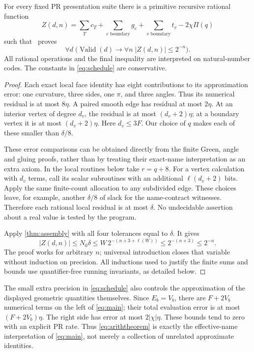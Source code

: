 \begin{theorem}\label{thm:arith}
For every fixed PR presentation suite there is a primitive recursive rational function
\begin{equation}\label{eq:Z}
Z(d,n)=\sum_Tc_T+
\sum_{e\text{ boundary}}g_e+
\sum_{v\text{ boundary}}t_v-2\chi\Pi(q)
\end{equation}
such that \ipra\ proves
\begin{equation}\label{eq:ariththeorem}
\forall d\;\bigl(\operatorname{Valid}(d)\longrightarrow
\forall n\;|Z(d,n)|\le2^{-n}\bigr).
\end{equation}
All rational operations and the final inequality are interpreted on natural-number codes. The constants in \eqref{eq:schedule} are conservative.
\end{theorem}
\begin{proof}
Each exact local face identity has eight contributions to its approximation error: one curvature, three sides, one $\pi$, and three angles. Thus its numerical residual is at most $8\eta$. A paired smooth edge has residual at most $2\eta$. At an interior vertex of degree $d_v$, the residual is at most $(d_v+2)\eta$; at a boundary vertex it is at most $(d_v+2)\eta$. Here $d_v\le3F$. Our choice of $q$ makes each of these smaller than $\delta/8$.

These error comparisons can be obtained directly from the finite Green, angle and gluing proofs, rather than by treating their exact-name interpretation as an extra axiom. In the local routines below take $r=q+8$. For a vertex calculation with $d_v$ terms, call its scalar subroutines with an additional $\ell(d_v+2)$ bits. Apply the same finite-count allocation to any subdivided edge. These choices leave, for example, another $\delta/8$ of slack for the name-contract witnesses. Therefore each rational local residual is at most $\delta$. No undecidable assertion about a real value is tested by the program.

Apply \cref{thm:assembly} with all four tolerances equal to $\delta$. It gives
\[
|Z(d,n)|\le N_0\delta
\le W\,2^{-(n+3+\ell(W))}
\le2^{-(n+3)}\le2^{-n}.
\]
The proof works for arbitrary $n$; universal introduction closes that variable without induction on precision. All inductions used to justify the finite sums and bounds use quantifier-free running invariants, as detailed below.
\end{proof}

The small extra precision in \eqref{eq:schedule} also controls the approximation of the displayed geometric quantities themselves. Since $E_b=V_b$, there are $F+2V_b$ numerical terms on the left of \eqref{eq:main}; their total evaluation error is at most $(F+2V_b)\eta$. The right side has error at most $2|\chi|\eta$. These bounds tend to zero with an explicit PR rate. Thus \eqref{eq:ariththeorem} is exactly the effective-name interpretation of \eqref{eq:main}, not merely a collection of unrelated approximate identities.

